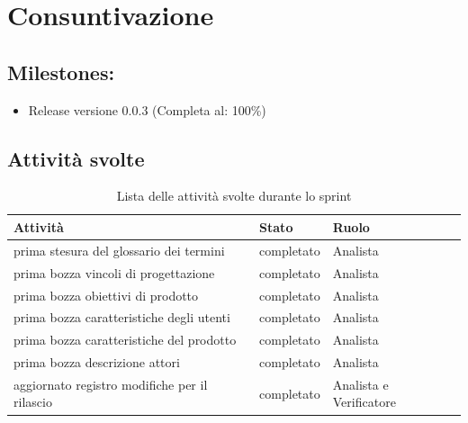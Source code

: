 \section{Consuntivazione}

\subsection{Milestones:}
\begin{itemize}
    \item Release versione 0.0.3 (Completa al: 100\%)
\end{itemize}

\subsection{Attività svolte}


\begin{table}[ht]
    \begin{tabularx}{\textwidth}{X l l}
        
        \rowcolor{gray!30} \textbf{Attività} & \textbf{Stato} & \textbf{Ruolo}\\
        
        \hline
        prima stesura del glossario dei termini & completato & Analista\\
        prima bozza vincoli di progettazione & completato & Analista\\
        prima bozza obiettivi di prodotto & completato & Analista\\
        prima bozza caratteristiche degli utenti & completato & Analista\\
        prima bozza caratteristiche del prodotto & completato & Analista\\
        prima bozza descrizione attori & completato & Analista\\
        aggiornato registro modifiche per il rilascio & completato & Analista e Verificatore\\
    \end{tabularx}
    \caption{Lista delle attività svolte durante lo sprint}
\end{table}


